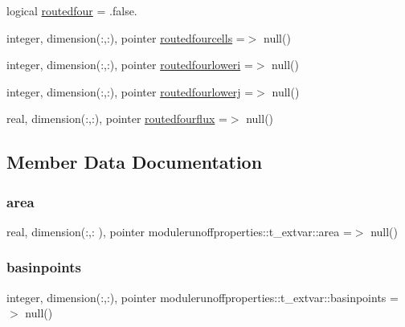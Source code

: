\begin{DoxyCompactItemize}
\item 
logical \mbox{\hyperlink{structmodulerunoffproperties_1_1t__extvar_aa8e622b5c8f35e602939288f81f3ebf9}{routedfour}} = .false.
\item 
integer, dimension(\+:,\+:), pointer \mbox{\hyperlink{structmodulerunoffproperties_1_1t__extvar_ae09d84e8d513d0bdf8b45489b73f3590}{routedfourcells}} =$>$ null()
\item 
integer, dimension(\+:,\+:), pointer \mbox{\hyperlink{structmodulerunoffproperties_1_1t__extvar_a77f7d41693d1ae5118601f290c18daba}{routedfourloweri}} =$>$ null()
\item 
integer, dimension(\+:,\+:), pointer \mbox{\hyperlink{structmodulerunoffproperties_1_1t__extvar_a55de708cbfefbd967d4a3ec831e75abc}{routedfourlowerj}} =$>$ null()
\item 
real, dimension(\+:,\+:), pointer \mbox{\hyperlink{structmodulerunoffproperties_1_1t__extvar_a7ff3e7c305f91cc9b22bf78ad3fceb2b}{routedfourflux}} =$>$ null()
\end{DoxyCompactItemize}


\subsection{Member Data Documentation}
\mbox{\label{structmodulerunoffproperties_1_1t__extvar_ae00437d688f50ab9dd135f11b0b3b51e}} 
\subsubsection{\texorpdfstring{area}{area}}
{\footnotesize\ttfamily real, dimension(\+:,\+:  ), pointer modulerunoffproperties\+::t\+\_\+extvar\+::area =$>$ null()\hspace{0.3cm}{\ttfamily [private]}}

\mbox{\label{structmodulerunoffproperties_1_1t__extvar_a985f517ca2c8523d2a02d3fed928ef48}} 
\subsubsection{\texorpdfstring{basinpoints}{basinpoints}}
{\footnotesize\ttfamily integer, dimension(\+:,\+:), pointer modulerunoffproperties\+::t\+\_\+extvar\+::basinpoints =$>$ null()\hspace{0.3cm}{\ttfamily [private]}}

